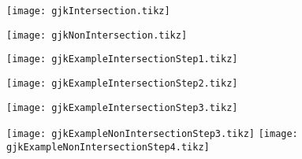 \documentclass[multi]{standalone}
\begin{document}
\texttt{[image: gjkIntersection.tikz]}


\texttt{[image: gjkNonIntersection.tikz]}

\texttt{[image: gjkExampleIntersectionStep1.tikz]}

\texttt{[image: gjkExampleIntersectionStep2.tikz]}

\texttt{[image: gjkExampleIntersectionStep3.tikz]}

\texttt{[image: gjkExampleNonIntersectionStep3.tikz]}
\texttt{[image: gjkExampleNonIntersectionStep4.tikz]}
\end{document}
